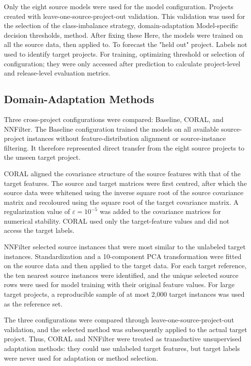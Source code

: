 \documentclass[conference]{IEEEtran}
\begin{document}
Only the eight source models were used for the model configuration.
Projects created with leave-one-source-project-out validation. This validation
was used for the selection of the class-imbalance strategy, domain-adaptation
Model-specific decision thresholds, method. After fixing these
Here, the models were trained on all the source data, then applied to.
To forecast the "held out" project. Labels not used to identify target projects.
For training, optimizing threshold or selection of configuration; they
were only accessed after prediction to calculate project-level and
release-level evaluation metrics.

\subsection{Domain-Adaptation Methods}
\label{subsec:domain-adaptation}

Three cross-project configurations were compared: Baseline, CORAL, and
NNFilter. The Baseline configuration trained the models on all available
source-project instances without feature-distribution alignment or
source-instance filtering. It therefore represented direct transfer
from the eight source projects to the unseen target project.

CORAL aligned the covariance structure of the source features with that
of the target features. The source and target matrices were first
centred, after which the source data were whitened using the inverse
square root of the source covariance matrix and recoloured using the
square root of the target covariance matrix. A regularization value of
\(\varepsilon=10^{-5}\) was added to the covariance matrices for
numerical stability. CORAL used only the target-feature values and did
not access the target labels.

NNFilter selected source instances that were most similar to the
unlabeled target instances. Standardization and a 10-component PCA
transformation were fitted on the source data and then applied to the
target data. For each target reference, the ten nearest source instances
were identified, and the unique selected source rows were used for model
training with their original feature values. For large target projects,
a reproducible sample of at most 2,000 target instances was used as the
reference set.

The three configurations were compared through
leave-one-source-project-out validation, and the selected method was
subsequently applied to the actual target project. Thus, CORAL and
NNFilter were treated as transductive unsupervised adaptation methods:
they could use unlabeled target features, but target labels were never
used for adaptation or method selection.
\end{document}
